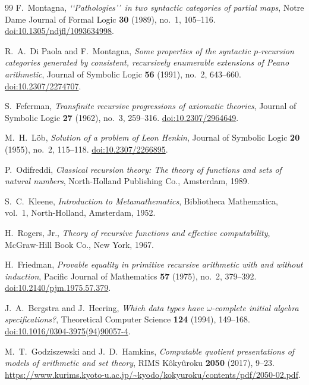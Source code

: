 \documentclass[11pt]{article}
\begin{document}
\begin{thebibliography}{99}
\small
{}
F.~Montagna,
\emph{\lq\lq Pathologies\rq\rq\ in two syntactic categories of partial maps},
Notre Dame Journal of Formal Logic \textbf{30} (1989), no.~1, 105--116.
\href{https://doi.org/10.1305/ndjfl/1093634998}{doi:10.1305/ndjfl/1093634998}.

R.~A.~Di Paola and F.~Montagna,
\emph{Some properties of the syntactic $p$-recursion categories generated
by consistent, recursively enumerable extensions of Peano arithmetic},
Journal of Symbolic Logic \textbf{56} (1991), no.~2, 643--660.
\href{https://doi.org/10.2307/2274707}{doi:10.2307/2274707}.

S.~Feferman,
\emph{Transfinite recursive progressions of axiomatic theories},
Journal of Symbolic Logic \textbf{27} (1962), no.~3, 259--316.
\href{https://doi.org/10.2307/2964649}{doi:10.2307/2964649}.

M.~H.~L\"ob,
\emph{Solution of a problem of Leon Henkin},
Journal of Symbolic Logic \textbf{20} (1955), no.~2, 115--118.
\href{https://doi.org/10.2307/2266895}{doi:10.2307/2266895}.

P.~Odifreddi,
\emph{Classical recursion theory:
The theory of functions and sets of natural numbers},
North-Holland Publishing Co., Amsterdam, 1989.

S.~C.~Kleene,
\emph{Introduction to Metamathematics},
Bibliotheca Mathematica, vol.~1,
North-Holland, Amsterdam, 1952.

H.~Rogers, Jr.,
\emph{Theory of recursive functions and effective computability},
McGraw-Hill Book Co., New York, 1967.

H.~Friedman,
\emph{Provable equality in primitive recursive arithmetic with and without
induction},
Pacific Journal of Mathematics \textbf{57} (1975), no.~2, 379--392.
\href{https://doi.org/10.2140/pjm.1975.57.379}{doi:10.2140/pjm.1975.57.379}.

J.~A.~Bergstra and J.~Heering,
\emph{Which data types have $\omega$-complete initial algebra specifications?},
Theoretical Computer Science \textbf{124} (1994), 149--168.
\href{https://doi.org/10.1016/0304-3975(94)90057-4}{doi:10.1016/0304-3975(94)90057-4}.

M.~T.~Godziszewski and J.~D.~Hamkins,
\emph{Computable quotient presentations of models of arithmetic and set theory},
RIMS K\^oky\^uroku \textbf{2050} (2017), 9--23.
\url{https://www.kurims.kyoto-u.ac.jp/~kyodo/kokyuroku/contents/pdf/2050-02.pdf}.


\end{thebibliography}
\end{document}
